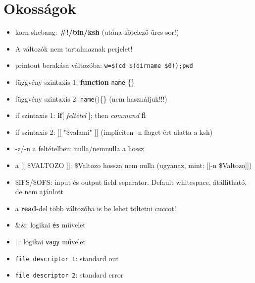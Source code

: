 \documentclass{article}
\begin{document}
\newpage
\section{Okosságok}
\begin{itemize}
	\item korn shebang: \textbf{\#!/bin/ksh} (utána kötelező üres sor!)
	\item A változók nem tartalmaznak perjelet!
	\item printout berakása változóba: \texttt{w=\$(cd \$(dirname \$0));pwd}
	\item függvény szintaxis 1: \textbf{function} \texttt{name} \{\}
	\item függvény szintaxis 2: \texttt{name}()\{\} (nem használjuk!!!)
	\item if szintaxis 1: \textbf{if}[ \textit{feltétel} ]; then \textit{command} \textbf{fi}
	\item if szintaxis 2: [[ "\$valami" ]] (impliciten -n flaget ért alatta a ksh)
	\item -z/-n a feltételben: nulla/nemnulla a hossz
	\item a [[ \$VALTOZO ]]: \$Valtozo hossza nem nulla (ugyanaz, mint: [[-n \$Valtozo]])
	\item \$IFS/\$OFS: input és output field separator. Default whitespace, átállitható, de nem ajánlott
	\item a \textbf{read}-del több változóba is be lehet töltetni cuccot!
	\item \&\&: logikai \texttt{és} művelet
	\item $||$: logikai \texttt{vagy} művelet
	\item \texttt{file descriptor 1}: standard out
	\item \texttt{file descriptor 2}: standard error 
	
\end{itemize}
\end{document}
